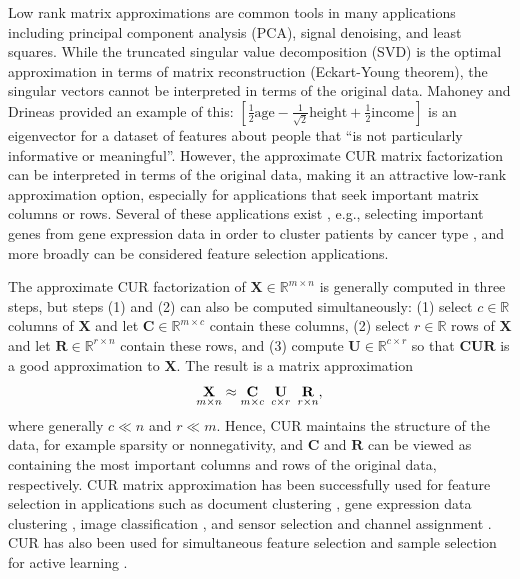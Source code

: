 \documentclass[12pt]{article}
\begin{document}
Low rank matrix approximations are common tools in many applications including principal component analysis (PCA), signal denoising, and least squares. While the truncated singular value decomposition (SVD) is the optimal approximation in terms of matrix reconstruction (Eckart-Young theorem), the singular vectors cannot be interpreted in terms of the original data. Mahoney and Drineas \cite{mahoney_drineas_2009} provided an example of this: $[\frac{1}{2}\text{age} - \frac{1}{\sqrt{2}}\text{height} + \frac{1}{2}\text{income}]$ is an eigenvector for a dataset of features about people that ``is not particularly informative or meaningful''.  However, the approximate CUR matrix factorization can be interpreted in terms of the original data, making it an attractive low-rank approximation option, especially for applications that seek important matrix columns or rows. Several of these applications exist \cite{sorenson_embree_2016}, e.g., selecting important genes from gene expression data in order to cluster patients by cancer type \cite{mahoney_drineas_2009}, and more broadly can be considered feature selection applications.  

The approximate CUR factorization of $\mathbf{X} \in \mathbb{R}^{m \times n}$ is generally computed in three steps, but steps (1) and (2) can also be computed simultaneously: (1) select $c \in \mathbb{R}$ columns of $\mathbf{X}$ and let $\mathbf{C} \in \mathbb{R}^{m \times c}$ contain these columns, (2) select $r \in \mathbb{R}$ rows of $\mathbf{X}$ and let $\mathbf{R} \in \mathbb{R}^{r \times n}$ contain these rows, and (3) compute $\mathbf{U} \in \mathbb{R}^{c \times r}$ so that $\mathbf{CUR}$ is a good approximation to $\mathbf{X}$.  The result is a matrix approximation
\begin{equation*}
\underset{m \times n}{\mathbf{X}} \approx \underset{m \times c}{\mathbf{C}} \hspace{0.5em} \underset{c \times r}{\mathbf{U}} \hspace{0.5em} \underset{r \times n}{\mathbf{R}} , 
\end{equation*}
\noindent  where generally $c \ll n$ and $r \ll m$.  Hence, CUR maintains the structure of the data, for example sparsity or nonnegativity, and
 $\mathbf{C}$ and $\mathbf{R}$ can be viewed as containing the most important columns and rows of the original data, respectively.  CUR matrix approximation has been successfully used for feature selection in applications such as document clustering \cite{mahoney_drineas_2009}, gene expression data clustering \cite{mahoney_drineas_2009, sorenson_embree_2016}, image classification \cite{liu_shao_2010}, and sensor selection and channel assignment \cite{esmaeili_etal_2021}.  CUR has also been used for simultaneous feature selection and sample selection for active learning \cite{li_etal_2019}. 
\end{document}
